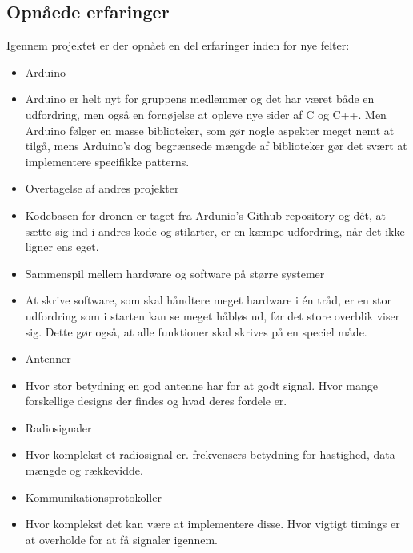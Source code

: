 \documentclass[Main]{subfiles}
\begin{document}
\subsection{Opnåede erfaringer}

Igennem projektet er der opnået en del erfaringer inden for nye felter:

\begin{itemize}
\item Arduino
\item[] Arduino er helt nyt for gruppens medlemmer og det har været både en udfordring, men også en fornøjelse at opleve nye sider af C og C++.
Men Arduino følger en masse biblioteker, som gør nogle aspekter meget nemt at tilgå, mens Arduino's dog begrænsede mængde af biblioteker gør det svært at implementere specifikke patterns.

\item Overtagelse af andres projekter
\item[] Kodebasen for dronen er taget fra Ardunio's Github repository og dét, at sætte sig ind i andres kode og stilarter, er en kæmpe udfordring, når det ikke ligner ens eget.


\item Sammenspil mellem hardware og software på større systemer
\item[] At skrive software, som skal håndtere meget hardware i én tråd, er en stor udfordring som i starten kan se meget håbløs ud, før det store overblik viser sig.
Dette gør også, at alle funktioner skal skrives på en speciel måde.

\item Antenner
\item[] Hvor stor betydning en god antenne har for at godt signal. Hvor mange forskellige designs der findes og hvad deres fordele er.

\item Radiosignaler
\item[] Hvor komplekst et radiosignal er. frekvensers betydning for hastighed, data mængde og rækkevidde.

\item Kommunikationsprotokoller
\item[] Hvor komplekst det kan være at implementere disse. Hvor vigtigt timings er at overholde for at få signaler igennem. 

\end{itemize}
\end{document}

